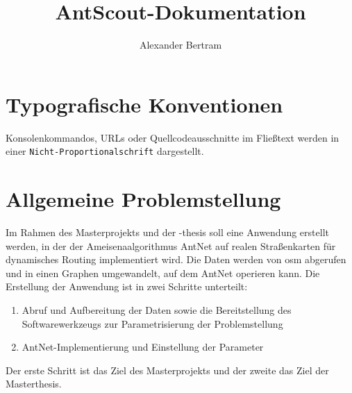 \documentclass[
  BCOR = 10mm,
  bibliography = totoc,
  listof = totoc,
  parskip = half
]{scrreprt}
\author{Alexander Bertram}
\title{AntScout-Dokumentation}
\begin{document}

\maketitle

\tableofcontents
\listoffigures
\listoftables
\renewcommand{\lstlistlistingname}{Listingsverzeichnis}
\lstlistoflistings


\clearpage


\chapter{Typografische Konventionen}
\label{chap:typografische-konventionen}

Konsolenkommandos, URLs oder Quellcodeausschnitte im Fließtext werden in einer \texttt{Nicht-Proportionalschrift} dargestellt.

\chapter{Allgemeine Problemstellung}
\label{chap:allgemeine-problemstellung}

Im Rahmen des Masterprojekts und der -thesis soll eine Anwendung erstellt werden, in der der Ameisenaalgorithmus AntNet auf realen Straßenkarten für dynamisches Routing implementiert wird.
Die Daten werden von \ac{osm} abgerufen und in einen Graphen umgewandelt, auf dem AntNet operieren kann.
Die Erstellung der Anwendung ist in zwei Schritte unterteilt:

\begin{enumerate}
  \item Abruf und Aufbereitung der Daten sowie die Bereitstellung des Softwarewerkzeugs zur Parametrisierung der Problemstellung
  \item AntNet-Implementierung und Einstellung der Parameter
\end{enumerate}

Der erste Schritt ist das Ziel des Masterprojekts und der zweite das Ziel der Masterthesis.






\end{document}
